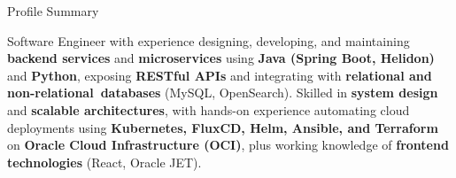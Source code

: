 \documentclass{resume}
\begin{document}
\begin{rSection}{Profile Summary}

Software Engineer with experience designing, developing, and maintaining \textbf{backend services} and \textbf{microservices} using \textbf{Java (Spring Boot, Helidon)} and \textbf{Python}, exposing \textbf{RESTful APIs} and integrating with \textbf{relational and non-relational~databases} (MySQL, OpenSearch). Skilled in \textbf{system design} and \textbf{scalable architectures}, with hands-on experience automating cloud deployments using \textbf{Kubernetes, FluxCD, Helm, Ansible, and Terraform} on \textbf{Oracle Cloud Infrastructure (OCI)}, plus working knowledge of \textbf{frontend technologies} (React, Oracle JET).

\end{rSection}
\end{document}
